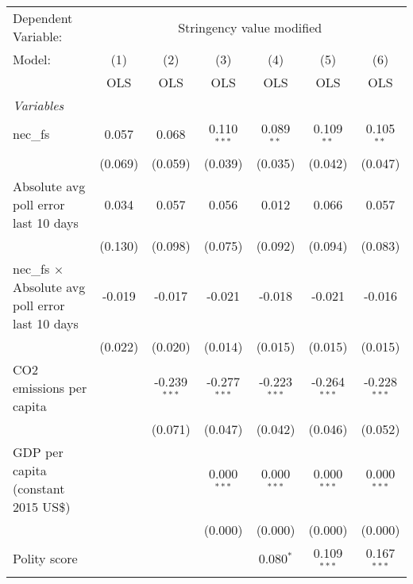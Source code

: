 
\begingroup
\centering
\begin{tabular}{lcccccc}
   \toprule
   Dependent Variable: & \multicolumn{6}{c}{Stringency value modified}\\
   Model:                                                  & (1)     & (2)            & (3)            & (4)            & (5)            & (6)\\  
                                                           &  OLS    & OLS            & OLS            & OLS            & OLS            & OLS\\  
   \midrule
   \emph{Variables}\\
   nec\_fs                                                 & 0.057   & 0.068          & 0.110$^{***}$  & 0.089$^{**}$   & 0.109$^{**}$   & 0.105$^{**}$\\   
                                                           & (0.069) & (0.059)        & (0.039)        & (0.035)        & (0.042)        & (0.047)\\   
   Absolute avg poll error last 10 days                    & 0.034   & 0.057          & 0.056          & 0.012          & 0.066          & 0.057\\   
                                                           & (0.130) & (0.098)        & (0.075)        & (0.092)        & (0.094)        & (0.083)\\   
   nec\_fs $\times$ Absolute avg poll error last 10 days   & -0.019  & -0.017         & -0.021         & -0.018         & -0.021         & -0.016\\   
                                                           & (0.022) & (0.020)        & (0.014)        & (0.015)        & (0.015)        & (0.015)\\   
   CO2 emissions per capita                                &         & -0.239$^{***}$ & -0.277$^{***}$ & -0.223$^{***}$ & -0.264$^{***}$ & -0.228$^{***}$\\   
                                                           &         & (0.071)        & (0.047)        & (0.042)        & (0.046)        & (0.052)\\   
   GDP per capita (constant 2015 US\$)                     &         &                & 0.000$^{***}$  & 0.000$^{***}$  & 0.000$^{***}$  & 0.000$^{***}$\\   
                                                           &         &                & (0.000)        & (0.000)        & (0.000)        & (0.000)\\   
   Polity score                                            &         &                &                & 0.080$^{*}$    & 0.109$^{***}$  & 0.167$^{***}$\\   

\end{tabular}
